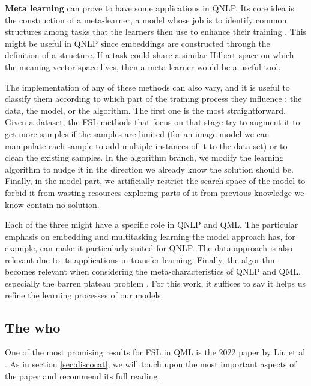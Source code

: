 \textbf{Meta learning} can prove to have some applications in QNLP. Its core idea is the construction of a meta-learner, a model whose job is to identify common structures among tasks that the learners then use to enhance their training \cite{goos_learning_2001,hospedales_meta-learning_2021}. This might be useful in QNLP since embeddings are constructed through the definition of a structure. If a task could share a similar Hilbert space on which the meaning vector space lives, then a meta-learner would be a useful tool.


The implementation of any of these methods can also vary, and it is useful to classify them according to which part of the training process they influence \cite{wang_generalizing_2021}: the data, the model, or the algorithm. The first one is the most straightforward. Given a dataset, the FSL methods that focus on that stage try to augment it to get more samples if the samples are limited (for an image model we can manipulate each sample to add multiple instances of it to the data set) or to clean the existing samples. In the algorithm branch, we modify the learning algorithm to nudge it in the direction we already know the solution should be. Finally, in the model part, we artificially restrict the search space of the model to forbid it from wasting resources exploring parts of it from previous knowledge we know contain no solution.

Each of the three might have a specific role in QNLP and QML. The particular emphasis on embedding and multitasking learning the model approach has, for example, can make it particularly suited for QNLP. The data approach is also relevant due to its applications in transfer learning. Finally, the algorithm becomes relevant when considering the meta-characteristics of QNLP and QML, especially the barren plateau problem \cite{friedrich_avoiding_2022,holmes_connecting_2022,wang_noise-induced_2021,cerezo_cost_2021,patti_entanglement_2021,mcclean_barren_2018}. For this work, it suffices to say it helps us refine the learning processes of our models.

\subsection{The who}\label{sec:who}
One of the most promising results for FSL in QML is the 2022 paper by Liu et al \cite{liu_embedding_2022}. As in section \ref{sec:discocat}, we will touch upon the most important aspects of the paper and recommend its full reading.

